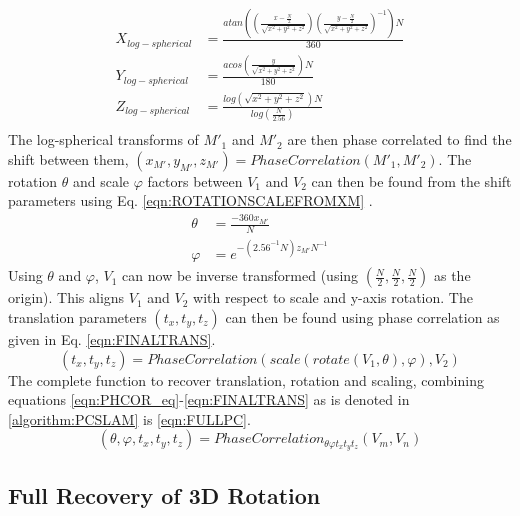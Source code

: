 \begin{equation} \label{eqn:Log_Spherical}
\begin{split}
X_{log-spherical} & = \frac{atan\left(
\left(\frac{x-\frac{N}{2}}{\sqrt{x^2+y^2+z^2}}\right)
\left(\frac{y-\frac{N}{2}}{\sqrt{x^2+y^2+z^2}}\right)^{-1}
\right)N}{360}\\
Y_{log-spherical} & = \frac{acos\left(
\frac{y}{\sqrt{x^2+y^2+z^2}}
\right)N}
{180} \\
Z_{log-spherical} & =\frac{log\left(\sqrt{x^2+y^2+z^2}\right)N}{log\left( \frac{N}{2.56} \right)} \\
\end{split}
\end{equation}
The log-spherical transforms of $M'_1$ and $M'_2$ are then phase correlated to find the shift between them, $(x_{M'},y_{M'},z_{M'}) = PhaseCorrelation(M'_1, M'_2)$. The rotation $\theta$ and scale $\varphi$ factors between $V_1$ and $V_2$ can then be found from the shift parameters using Eq. \ref{eqn:ROTATIONSCALEFROMXM} . 
\begin{equation} \label{eqn:ROTATIONSCALEFROMXM}
\begin{split}
\theta & = \frac{-360x_{M'}}{N}\\
\varphi & = e^{
-\left(
2.56^{-1}N
\right)z_{M'}N^{-1}
}
\end{split}
\end{equation}
Using $\theta$ and $\varphi$, $V_1$ can now be inverse transformed (using $(\frac{N}{2}, \frac{N}{2}, \frac{N}{2})$ as the origin). This aligns $V_1$ and $V_2$ with respect to scale and y-axis rotation. The translation parameters $(t_x, t_y, t_z)$ can then be found using phase correlation as given in Eq. \ref{eqn:FINALTRANS}.
\begin{equation} \label{eqn:FINALTRANS}
(t_x, t_y, t_z) = PhaseCorrelation(scale(rotate(V_1,\theta),\varphi), V_2)
\end{equation}
The complete function to recover translation, rotation and scaling, combining equations \ref{eqn:PHCOR_eq}-\ref{eqn:FINALTRANS} as is denoted in \ref{algorithm:PCSLAM} is \ref{eqn:FULLPC}.
\begin{equation} \label{eqn:FULLPC}
(\theta, \varphi, t_x, t_y, t_z) = PhaseCorrelation_{\theta \varphi t_x t_y t_z}(V_m, V_n)
\end{equation}

\subsection{Full Recovery of 3D Rotation}

